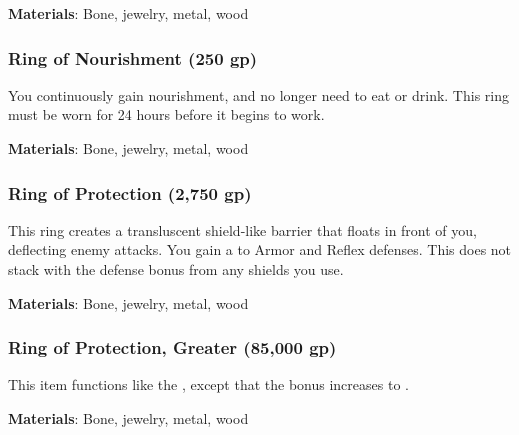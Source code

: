 \vspace{0.25em}
\textbf{Materials}: Bone, jewelry, metal, wood


\lowercase{\hypertarget{item:Ring of Nourishment}{}}\label{item:Ring of Nourishment}
\hypertarget{item:Ring of Nourishment}{\subsubsection{Ring of Nourishment\hfill{} (250 gp)}}

You continuously gain nourishment, and no longer need to eat or drink.
This ring must be worn for 24 hours before it begins to work.



\vspace{0.25em}
\textbf{Materials}: Bone, jewelry, metal, wood


\lowercase{\hypertarget{item:Ring of Protection}{}}\label{item:Ring of Protection}
\hypertarget{item:Ring of Protection}{\subsubsection{Ring of Protection\hfill{} (2,750 gp)}}

This ring creates a transluscent shield-like barrier that floats in front of you, deflecting enemy attacks.
You gain a   to Armor and Reflex defenses.
This does not stack with the defense bonus from any shields you use.



\vspace{0.25em}
\textbf{Materials}: Bone, jewelry, metal, wood


\lowercase{\hypertarget{item:Ring of Protection, Greater}{}}\label{item:Ring of Protection, Greater}
\hypertarget{item:Ring of Protection, Greater}{\subsubsection{Ring of Protection, Greater\hfill{} (85,000 gp)}}

This item functions like the , except that the bonus increases to .



\vspace{0.25em}
\textbf{Materials}: Bone, jewelry, metal, wood


